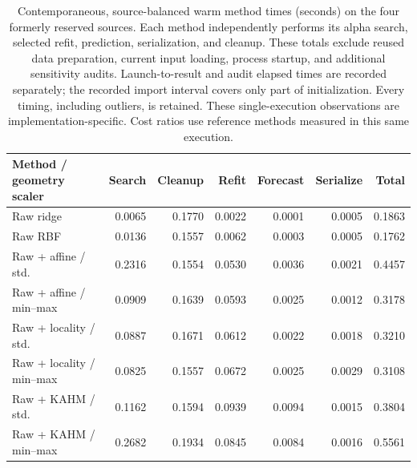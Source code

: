 \begin{table}[!htbp]
\centering
\scriptsize
\begin{tabular}{lrrrrrr}
\toprule
Method / geometry scaler & Search & Cleanup & Refit & Forecast & Serialize & Total \\
\midrule
Raw ridge & 0.0065 & 0.1770 & 0.0022 & 0.0001 & 0.0005 & 0.1863 \\
Raw RBF & 0.0136 & 0.1557 & 0.0062 & 0.0003 & 0.0005 & 0.1762 \\
Raw + affine / std. & 0.2316 & 0.1554 & 0.0530 & 0.0036 & 0.0021 & 0.4457 \\
Raw + affine / min--max & 0.0909 & 0.1639 & 0.0593 & 0.0025 & 0.0012 & 0.3178 \\
Raw + locality / std. & 0.0887 & 0.1671 & 0.0612 & 0.0022 & 0.0018 & 0.3210 \\
Raw + locality / min--max & 0.0825 & 0.1557 & 0.0672 & 0.0025 & 0.0029 & 0.3108 \\
Raw + KAHM / std. & 0.1162 & 0.1594 & 0.0939 & 0.0094 & 0.0015 & 0.3804 \\
Raw + KAHM / min--max & 0.2682 & 0.1934 & 0.0845 & 0.0084 & 0.0016 & 0.5561 \\
\bottomrule
\end{tabular}
\caption{Contemporaneous, source-balanced warm method times (seconds) on the four formerly reserved sources. Each method independently performs its alpha search, selected refit, prediction, serialization, and cleanup. These totals exclude reused data preparation, current input loading, process startup, and additional sensitivity audits. Launch-to-result and audit elapsed times are recorded separately; the recorded import interval covers only part of initialization. Every timing, including outliers, is retained. These single-execution observations are implementation-specific. Cost ratios use reference methods measured in this same execution.}
\label{tab:scaling-costs}
\end{table}

